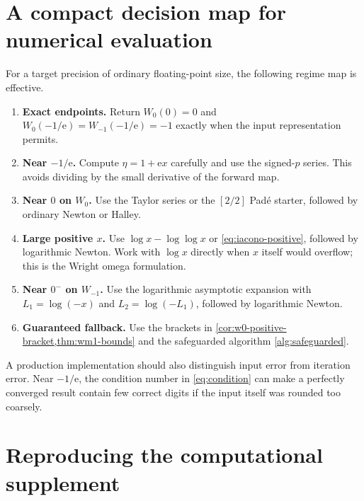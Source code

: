 \documentclass[11pt]{article}
\numberwithin{equation}{section}
\theoremstyle{definition}
\theoremstyle{remark}
\newcommand{\e}{\mathrm e}
\begin{document}
\section{A compact decision map for numerical evaluation}
\label{app:numerical-map}

For a target precision of ordinary floating-point size, the following regime
map is effective.

\begin{enumerate}
\item \textbf{Exact endpoints.}
Return $W_0(0)=0$ and $W_0(-1/\e)=W_{-1}(-1/\e)=-1$ exactly when the input
representation permits.

\item \textbf{Near $-1/\e$.}
Compute $\eta=1+\e x$ carefully and use the signed-$p$ series.  This avoids
dividing by the small derivative of the forward map.

\item \textbf{Near $0$ on $W_0$.}
Use the Taylor series or the $[2/2]$ Pad\'e starter, followed by ordinary
Newton or Halley.

\item \textbf{Large positive $x$.}
Use $\log x-\log\log x$ or \eqref{eq:iacono-positive}, followed by logarithmic
Newton.  Work with $\log x$ directly when $x$ itself would overflow; this is
the Wright omega formulation.

\item \textbf{Near $0^-$ on $W_{-1}$.}
Use the logarithmic asymptotic expansion with
$L_1=\log(-x)$ and $L_2=\log(-L_1)$, followed by logarithmic Newton.

\item \textbf{Guaranteed fallback.}
Use the brackets in \cref{cor:w0-positive-bracket,thm:wm1-bounds} and the
safeguarded algorithm \ref{alg:safeguarded}.
\end{enumerate}

A production implementation should also distinguish input error from
iteration error.  Near $-1/\e$, the condition number in
\eqref{eq:condition} can make a perfectly converged result contain few correct
digits if the input itself was rounded too coarsely.

\section{Reproducing the computational supplement}
\label{app:reproduce}
\end{document}
